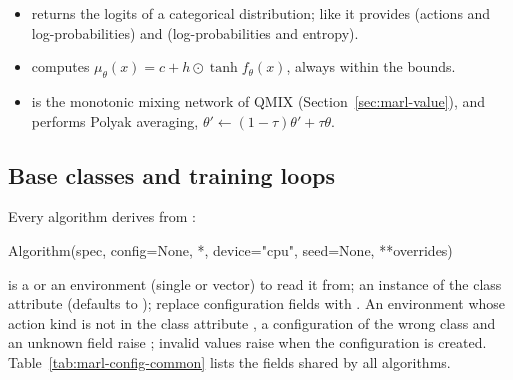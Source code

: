 \begin{itemize}
    $\ell$ initialised to . Samples are unbounded; the
    log-density $\sum_k \log \mathcal{N}(a_k)$ is that of the unclipped sample,
    and the entropy is $\sum_k \bigl(\tfrac12 + \tfrac12 \log 2\pi + \log
    \sigma_k\bigr)$. A shared policy keeps the bounds of all agents, so agents
    with different action ranges can share it.
  \item {} returns the logits of a categorical
    distribution; like  it provides
     (actions and log-probabilities) and
     (log-probabilities and entropy).
  \item {} computes $\mu_\theta(x) = c + h \odot
    \tanh f_\theta(x)$, always within the bounds.
  \item {} is the monotonic mixing network of QMIX
    (Section~\ref{sec:marl-value}), and  performs Polyak
    averaging, $\theta' \leftarrow (1 - \tau)\theta' + \tau\theta$.
\end{itemize}

\subsection{Base classes and training loops}\label{sec:marl-base}

Every algorithm derives from :

\begin{pycode}
Algorithm(spec, config=None, *, device="cpu", seed=None, **overrides)
\end{pycode}

 is a  or an environment (single or vector) to
read it from;  an instance of the class attribute
 (defaults to ); 
replace configuration fields with . An environment
whose action kind is not in the class attribute , a
configuration of the wrong class and an unknown field raise ;
invalid values raise  when the configuration is created.
Table~\ref{tab:marl-config-common} lists the fields shared by all algorithms.

